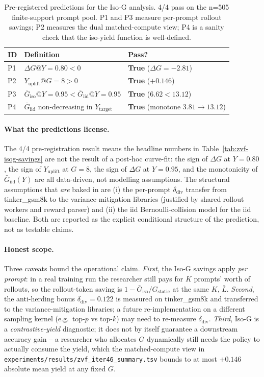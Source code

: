 \begin{table}[htbp]
\centering\small
\setlength{\tabcolsep}{4pt}
\begin{tabular}{lll}
\hline
ID & Definition & Pass? \\
\hline
P1 & $\Delta G @ Y{=}0.80 < 0$ & \textbf{True} ($\Delta G = -2.81$) \\
P2 & $Y_{\mathrm{uplift}} @ G{=}8 > 0$ & \textbf{True} ($+0.146$) \\
P3 & $\bar G_{\mathrm{iso}} @ Y{=}0.95 < \bar G_{\mathrm{iid}} @ Y{=}0.95$
   & \textbf{True} ($6.62 < 13.12$) \\
P4 & $\bar G_{\mathrm{iid}}$ non-decreasing in $Y_{\mathrm{target}}$
   & \textbf{True} (monotone $3.81 \to 13.12$) \\
\hline
\end{tabular}
\caption{Pre-registered predictions for the Iso-G analysis. 4/4 pass
on the n=505 finite-support prompt pool. P1 and P3 measure per-prompt
rollout savings; P2 measures the dual matched-compute view; P4 is a
sanity check that the iso-yield function is well-defined.}
\label{tab:zvf-isog-preds}
\end{table}

\paragraph{What the predictions license.}
The 4/4 pre-registration result means the headline numbers in
Table~\ref{tab:zvf-isog-savings} are not the result of a
post-hoc curve-fit: the sign of $\Delta G$ at $Y{=}0.80$, the sign of
$Y_{\mathrm{uplift}}$ at $G{=}8$, the sign of $\Delta G$ at
$Y{=}0.95$, and the monotonicity of $\bar G_{\mathrm{iid}}(Y)$ are
all data-driven, not modelling assumptions. The structural assumptions
that \emph{are} baked in are (i) the per-prompt $\delta_{\mathrm{div}}$
transfer from tinker\_gsm8k to the variance-mitigation libraries
(justified by shared rollout workers and reward parser) and
(ii) the iid Bernoulli-collision model for the iid baseline. Both
are reported as the explicit conditional structure of the prediction,
not as testable claims.

\paragraph{Honest scope.}
Three caveats bound the operational claim. \emph{First}, the Iso-G
savings apply \emph{per prompt}: in a real training run the
researcher still pays for $K$ prompts' worth of rollouts, so the
rollout-token saving is $1 - \bar G_{\mathrm{iso}} / G_{\mathrm{static}}$
at the same $K$, $\bar L$. \emph{Second}, the anti-herding bonus
$\delta_{\mathrm{div}}{=}0.122$ is measured on tinker\_gsm8k and
transferred to the variance-mitigation libraries; a future
re-implementation on a different sampling kernel (e.g.\ top-$p$ vs
top-$k$) may need to re-measure $\delta_{\mathrm{div}}$. \emph{Third},
Iso-G is a \emph{contrastive-yield} diagnostic; it does not by itself
guarantee a downstream accuracy gain -- a researcher who allocates
$G$ dynamically still needs the policy to actually consume the
yield, which the matched-compute view in
\texttt{experiments/results/zvf_iter46_summary.tsv} bounds to at most
$+0.146$ absolute mean yield at any fixed $G$.

